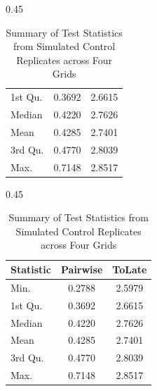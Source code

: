 \begin{table}[!htb]
\begin{subtable}[t]{0.45\textwidth}
\begin{table}[!h]
\begin{tabular}[t]{lcc}
1st Qu. & 0.3692 & 2.6615\\
Median & 0.4220 & 2.7626\\
Mean & 0.4285 & 2.7401\\
3rd Qu. & 0.4770 & 2.8039\\
\addlinespace
Max. & 0.7148 & 2.8517\\
\bottomrule
\end{tabular}
\end{table} 
\end{subtable}
\hfill
\begin{subtable}[t]{0.45\textwidth}
\centering
 \begin{table}[!h]
\centering
\caption{Summary of Test Statistics from Simulated Control Replicates (Grid 4)}
\centering
\begin{tabular}[t]{lcc}
\toprule
Statistic & Pairwise & ToLate\\
\midrule
Min. & 0.2788 & 2.5979\\
1st Qu. & 0.3692 & 2.6615\\
Median & 0.4220 & 2.7626\\
Mean & 0.4285 & 2.7401\\
3rd Qu. & 0.4770 & 2.8039\\
\addlinespace
Max. & 0.7148 & 2.8517\\
\bottomrule
\end{tabular}
\end{table} 
\end{subtable}
\caption{Summary of Test Statistics from Simulated Control Replicates across Four Grids}
\end{table}